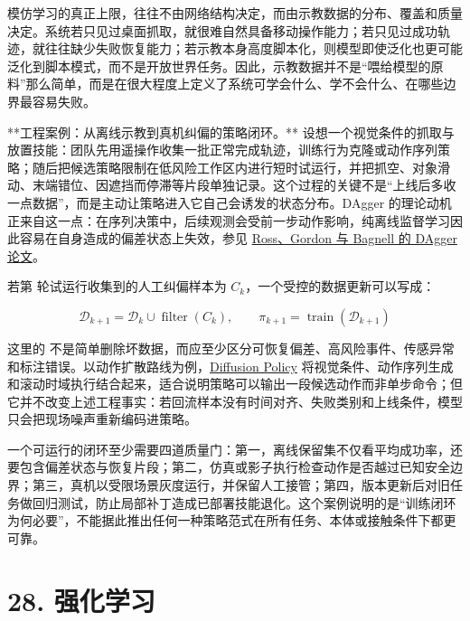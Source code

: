 模仿学习的真正上限，往往不由网络结构决定，而由示教数据的分布、覆盖和质量决定。系统若只见过桌面抓取，就很难自然具备移动操作能力；若只见过成功轨迹，就往往缺少失败恢复能力；若示教本身高度脚本化，则模型即使泛化也更可能泛化到脚本模式，而不是开放世界任务。因此，示教数据并不是“喂给模型的原料”那么简单，而是在很大程度上定义了系统可学会什么、学不会什么、在哪些边界最容易失败。

**工程案例：从离线示教到真机纠偏的策略闭环。** 设想一个视觉条件的抓取与放置技能：团队先用遥操作收集一批正常完成轨迹，训练行为克隆或动作序列策略；随后把候选策略限制在低风险工作区内进行短时试运行，并把抓空、对象滑动、末端错位、因遮挡而停滞等片段单独记录。这个过程的关键不是“上线后多收一点数据”，而是主动让策略进入它自己会诱发的状态分布。DAgger 的理论动机正来自这一点：在序列决策中，后续观测会受前一步动作影响，纯离线监督学习因此容易在自身造成的偏差状态上失效，参见 \href{https://proceedings.mlr.press/v15/ross11a.html}{Ross、Gordon 与 Bagnell 的 DAgger 论文}。

若第 \texttt{} 轮试运行收集到的人工纠偏样本为 \(C_k\)，一个受控的数据更新可以写成：

\begingroup
\scriptsize
\begin{equation*}
\mathcal{D}_{k+1} = \mathcal{D}_k \cup \operatorname{filter}(C_k),
\qquad \pi_{k+1} = \operatorname{train}(\mathcal{D}_{k+1})
\end{equation*}
\endgroup

这里的 \texttt{} 不是简单删除坏数据，而应至少区分可恢复偏差、高风险事件、传感异常和标注错误。以动作扩散路线为例，\href{https://www.roboticsproceedings.org/rss19/p026.pdf}{Diffusion Policy} 将视觉条件、动作序列生成和滚动时域执行结合起来，适合说明策略可以输出一段候选动作而非单步命令；但它并不改变上述工程事实：若回流样本没有时间对齐、失败类别和上线条件，模型只会把现场噪声重新编码进策略。

一个可运行的闭环至少需要四道质量门：第一，离线保留集不仅看平均成功率，还要包含偏差状态与恢复片段；第二，仿真或影子执行检查动作是否越过已知安全边界；第三，真机以受限场景灰度运行，并保留人工接管；第四，版本更新后对旧任务做回归测试，防止局部补丁造成已部署技能退化。这个案例说明的是“训练闭环为何必要”，不能据此推出任何一种策略范式在所有任务、本体或接触条件下都更可靠。

\section*{28. 强化学习}

